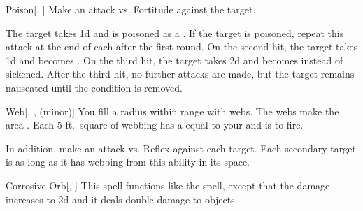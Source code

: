 \lowercase{\hypertarget{spell:Poison}{}}\label{spell:Poison}
\begin{freeability}[\nth{2}]{\hypertarget{spell:Poison}{Poison}}[, ]
Make an attack vs. Fortitude against the target.

\hit The target takes  \minus1d and is poisoned as a .
If the target is poisoned, repeat this attack at the end of each  after the first round.
On the second hit, the target takes  \minus1d and becomes .
On the third hit, the target takes  \plus2d and becomes  instead of sickened.
After the third hit, no further attacks are made, but the target remains nauseated until the condition is removed.
\end{freeability}
\vspace{0.25em}



\lowercase{\hypertarget{spell:Web}{}}\label{spell:Web}
\begin{freeability}[\nth{2}]{\hypertarget{spell:Web}{Web}}[, ,  (minor)]
You fill a \areasmall radius  within \rngclose range with webs.
The webs make the area .
Each 5-ft.\ square of webbing has a  equal to your  and is  to fire.

In addition, make an attack vs. Reflex against each target.
\hit Each secondary target is  as long as it has webbing from this ability in its space.
\end{freeability}
\vspace{0.25em}



\lowercase{\hypertarget{spell:Corrosive Orb}{}}\label{spell:Corrosive Orb}
\begin{freeability}[\nth{3}]{\hypertarget{spell:Corrosive Orb}{Corrosive Orb}}[, ]
This spell functions like the  spell, except that the damage increases to  \plus2d and it deals double damage to objects.
\end{freeability}
\vspace{0.25em}



